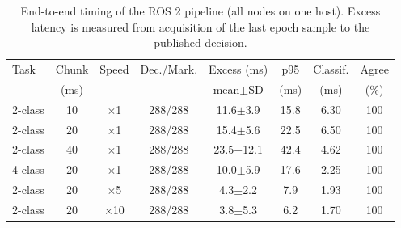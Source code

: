\begin{table}[t]
\centering
\caption{End-to-end timing of the ROS 2 pipeline (all nodes on one host). Excess latency is measured from acquisition of the last epoch sample to the published decision.}
\label{tab:ros}
\setlength{\tabcolsep}{2.5pt}
\footnotesize
\begin{tabular}{lccccccc}
\toprule
Task & Chunk & Speed & Dec./Mark. & Excess (ms) & p95 & Classif. & Agree \\
 & (ms) & & & mean$\pm$SD & (ms) & (ms) & (\%) \\
\midrule
2-class & 10 & $\times$1 & 288/288 & 11.6$\pm$3.9 & 15.8 & 6.30 & 100 \\
2-class & 20 & $\times$1 & 288/288 & 15.4$\pm$5.6 & 22.5 & 6.50 & 100 \\
2-class & 40 & $\times$1 & 288/288 & 23.5$\pm$12.1 & 42.4 & 4.62 & 100 \\
4-class & 20 & $\times$1 & 288/288 & 10.0$\pm$5.9 & 17.6 & 2.25 & 100 \\
2-class & 20 & $\times$5 & 288/288 & 4.3$\pm$2.2 & 7.9 & 1.93 & 100 \\
2-class & 20 & $\times$10 & 288/288 & 3.8$\pm$5.3 & 6.2 & 1.70 & 100 \\
\bottomrule
\end{tabular}
\end{table}
